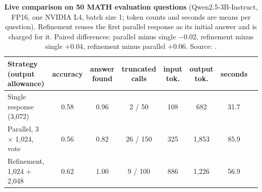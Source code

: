 \begin{table}[H]
  \centering
  \small
  \setlength{\tabcolsep}{4pt}
  \begin{tabular}{lccccccc}
    \toprule
    Strategy (output allowance) & accuracy & answer found & truncated calls & input tok. & output tok. & seconds \\
    \midrule
    Single response (3,072)                & 0.58 & 0.96 & 2 / 50   & 108 & 682   & 31.7 \\
    Parallel, 3 $\times$ 1,024, vote       & 0.56 & 0.82 & 26 / 150 & 325 & 1,853 & 85.9 \\
    Refinement, 1,024 + 2,048              & 0.62 & 1.00 & 9 / 100  & 886 & 1,226 & 56.9 \\
    \bottomrule
  \end{tabular}
  \caption{\textbf{Live comparison on 50 MATH evaluation questions} (Qwen2.5-3B-Instruct, FP16, one NVIDIA L4, batch size 1; token counts and seconds are means per question). Refinement reuses the first parallel response as its initial answer and is charged for it. Paired differences: parallel minus single $-0.02$, refinement minus single $+0.04$, refinement minus parallel $+0.06$. Source: .}
  \label{tab:task3live}
\end{table}



